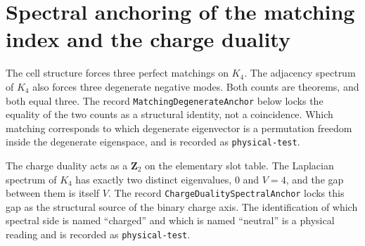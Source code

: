 \documentclass[11pt]{article}
\begin{document}
\section{Spectral anchoring of the matching index and the charge duality}

The cell structure forces three perfect matchings on $K_4$.  The
adjacency spectrum of $K_4$ also forces three degenerate negative
modes.  Both counts are theorems, and both equal three.  The record
\texttt{MatchingDegenerateAnchor} below locks the equality of the two
counts as a structural identity, not a coincidence.  Which matching
corresponds to which degenerate eigenvector is a permutation freedom
inside the degenerate eigenspace, and is recorded as
\texttt{physical-test}.

The charge duality acts as a $\mathbf{Z}_2$ on the elementary slot
table.  The Laplacian spectrum of $K_4$ has exactly two distinct
eigenvalues, $0$ and $V=4$, and the gap between them is itself $V$.
The record \texttt{ChargeDualitySpectralAnchor} locks this gap as the
structural source of the binary charge axis.  The identification of
which spectral side is named ``charged'' and which is named ``neutral''
is a physical reading and is recorded as \texttt{physical-test}.
\end{document}
